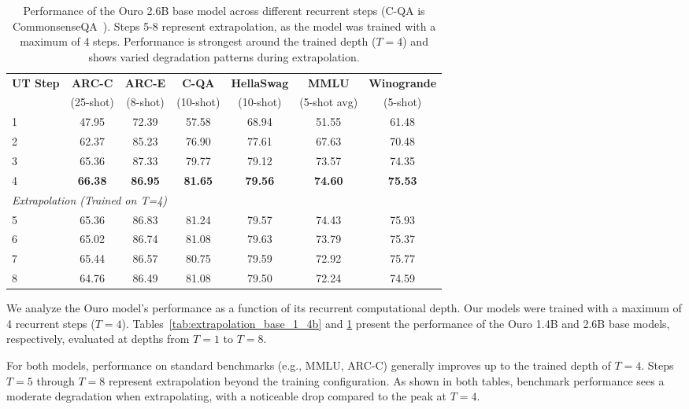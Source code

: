 \documentclass[]{bytedance_seed}
\newcommand{\1}{\mathbf{1}}
\begin{document}
\begin{table}[htbp]
\centering
\small
\caption{Performance of the Ouro 2.6B base model across different recurrent steps (C-QA is CommonsenseQA~\cite{talmor-etal-2019-commonsenseqa}). Steps 5-8 represent extrapolation, as the model was trained with a maximum of 4 steps. Performance is strongest around the trained depth ($T=4$) and shows varied degradation patterns during extrapolation.}
\label{tab:extrapolation_base_2_6b}
\begin{tabular}{lcccccc}
\toprule
\textbf{UT Step} & \textbf{ARC-C} & \textbf{ARC-E} & \textbf{C-QA} & \textbf{HellaSwag} & \textbf{MMLU} & \textbf{Winogrande} \\
& (25-shot) & (8-shot) & (10-shot) & (10-shot) & (5-shot avg) & (5-shot) \\
\midrule
1 & 47.95 & 72.39 & 57.58 & 68.94 & 51.55 & 61.48 \\
2 & 62.37 & 85.23 & 76.90 & 77.61 & 67.63 & 70.48 \\
3 & 65.36 & 87.33 & 79.77 & 79.12 & 73.57 & 74.35 \\
4 & \textbf{66.38} & \textbf{86.95} & \textbf{81.65} & \textbf{79.56} & \textbf{74.60} & \textbf{75.53} \\
\midrule[0.8pt]
\multicolumn{7}{l}{\textit{Extrapolation (Trained on T=4)}} \\
\midrule
5 & 65.36 & 86.83 & 81.24 & 79.57 & 74.43 & 75.93 \\
6 & 65.02 & 86.74 & 81.08 & 79.63 & 73.79 & 75.37 \\
7 & 65.44 & 86.57 & 80.75 & 79.59 & 72.92 & 75.77 \\
8 & 64.76 & 86.49 & 81.08 & 79.50 & 72.24 & 74.59 \\
\bottomrule
\end{tabular}
\end{table}

We analyze the Ouro model's performance as a function of its recurrent computational depth. Our models were trained with a maximum of 4 recurrent steps ($T=4$). Tables~\ref{tab:extrapolation_base_1_4b} and \ref{tab:extrapolation_base_2_6b} present the performance of the Ouro 1.4B and 2.6B base models, respectively, evaluated at depths from $T=1$ to $T=8$.

For both models, performance on standard benchmarks (e.g., MMLU, ARC-C) generally improves up to the trained depth of $T=4$. Steps $T=5$ through $T=8$ represent extrapolation beyond the training configuration. As shown in both tables, benchmark performance sees a moderate degradation when extrapolating, with a noticeable drop compared to the peak at $T=4$.
\end{document}
